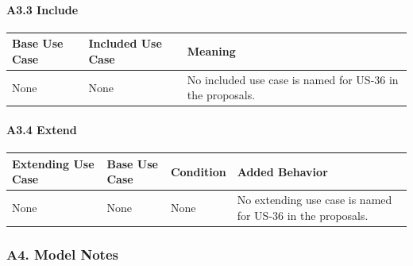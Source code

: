 \documentclass[12pt]{article}
\renewcommand{\baselinestretch}{1.5}
\begin{document}
\paragraph*{A3.3 Include}
\par\medskip

\begingroup
\small
\renewcommand{\baselinestretch}{1.0}\selectfont
\renewcommand{\arraystretch}{1.15}
\setlength{\tabcolsep}{6pt}
\begin{longtable}{|>{\raggedright\arraybackslash}p{}|>{\raggedright\arraybackslash}p{}|>{\raggedright\arraybackslash}p{}|}
\hline
\textbf{Base Use Case} & \textbf{Included Use Case} & \textbf{Meaning} \\ \hline
\endhead
None & None & No included use case is named for US-36 in the proposals. \\ \hline
\end{longtable}
\endgroup
\par\medskip

\hypertarget{sec:a3-4-extend}{}
\paragraph*{A3.4 Extend}
\par\medskip

\begingroup
\small
\renewcommand{\baselinestretch}{1.0}\selectfont
\renewcommand{\arraystretch}{1.15}
\setlength{\tabcolsep}{6pt}
\begin{longtable}{|>{\raggedright\arraybackslash}p{}|>{\raggedright\arraybackslash}p{}|>{\raggedright\arraybackslash}p{}|>{\raggedright\arraybackslash}p{}|}
\hline
\textbf{Extending Use Case} & \textbf{Base Use Case} & \textbf{Condition} & \textbf{Added Behavior} \\ \hline
\endhead
None & None & None & No extending use case is named for US-36 in the proposals. \\ \hline
\end{longtable}
\endgroup
\par\medskip

\hypertarget{sec:a4-model-notes}{}
\subsubsection*{A4. Model Notes}
\par\medskip
\end{document}
